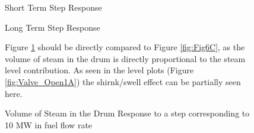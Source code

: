         \begin{figure}[ht]
            \begin{center}
                
                Short Term Step Response
                
                
                Long Term Step Response
                
                \caption{Volume of Steam in the Drum Response to a step corresponding to 10 MW in fuel flow rate}
                \label{fig:Valve_Open1E}
            \end{center}
            Figure \ref{fig:Valve_Open1E} should be directly compared to Figure \ref{fig:Fig6C}, as the volume of steam in the drum is directly proportional to the steam level contribution. As seen in the level plots (Figure \ref{fig:Valve_Open1A}) the shirnk/swell effect can be partially seen here. 
        \end{figure}  %
        

